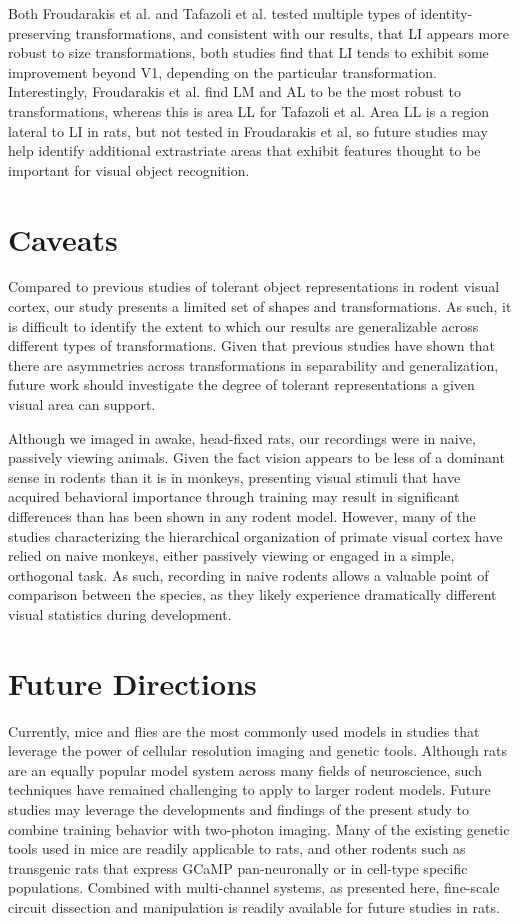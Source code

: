 Both Froudarakis et al. and Tafazoli et al. tested multiple types of identity-preserving transformations, and consistent with our results, that LI appears more robust to size transformations, both studies find that LI tends to exhibit some improvement beyond V1, depending on the particular transformation. Interestingly, Froudarakis et al. find LM and AL to be the most robust to transformations, whereas this is area LL for Tafazoli et al. Area LL is a region lateral to LI in rats, but not tested in Froudarakis et al, so future studies may help identify additional extrastriate areas that exhibit features thought to be important for visual object recognition.  

\section{Caveats}
Compared to previous studies of tolerant object representations in rodent visual cortex, our study presents a limited set of shapes and transformations. As such, it is difficult to identify the extent to which our results are generalizable across different types of transformations. Given that previous studies have shown that there are asymmetries across transformations in separability and generalization, future work should investigate the degree of tolerant representations a given visual area can support. 

Although we imaged in awake, head-fixed rats, our recordings were in naive, passively viewing animals. Given the fact vision appears to be less of a dominant sense in rodents than it is in monkeys, presenting visual stimuli that have acquired behavioral importance through training may result in significant differences than has been shown in any rodent model. However, many of the studies characterizing the hierarchical organization of primate visual cortex have relied on naive monkeys, either passively viewing or engaged in a simple, orthogonal task\cite{REFREF}. As such, recording in naive rodents allows a valuable point of comparison between the species, as they likely experience dramatically different visual statistics during development.

\section{Future Directions}
Currently, mice and flies are the most commonly used models in studies that leverage the power of cellular resolution imaging and genetic tools. Although rats are an equally popular model system across many fields of neuroscience, such techniques have remained challenging to apply to larger rodent models. Future studies may leverage the developments and findings of the present study to combine training behavior with two-photon imaging. Many of the existing genetic tools used in mice are readily applicable to rats, and other rodents such as transgenic rats that express GCaMP pan-neuronally or in cell-type specific populations. Combined with multi-channel systems, as presented here, fine-scale circuit dissection and manipulation is readily available for future studies in rats. 

